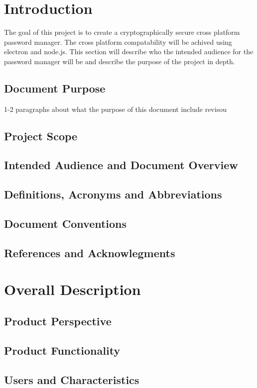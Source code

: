 \documentclass{report}
\begin{document}
\clearpage


\tableofcontents{}

\chapter{Introduction}
The goal of this project is to create a cryptographically
secure cross platform password manager. The cross platform
compatability will be achived using electron and node.js.
This section will describe who the intended audience for the
password manager will be and describe the purpose of the
project in depth.
\section{Document Purpose}
1-2 paragraphs about what the purpose of this document
include revisou
\section{Project Scope}
\section{Intended Audience and Document Overview}
\section{Definitions, Acronyms and Abbreviations}
\section{Document Conventions}
\section{References and Acknowlegments}

\chapter{Overall Description}
\section{Product Perspective}
\section{Product Functionality}
\section{Users and Characteristics}
\end{document}

